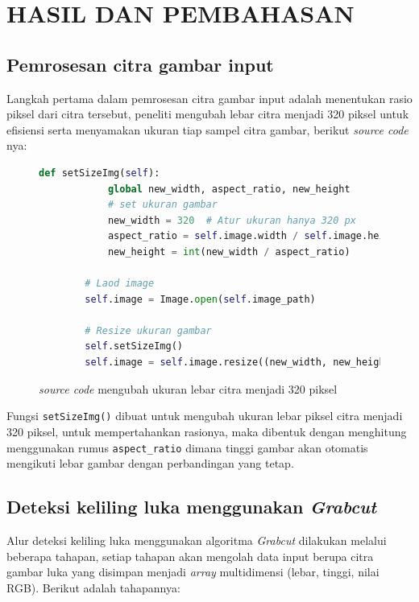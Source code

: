
\chapter{HASIL DAN PEMBAHASAN}

\section{Pemrosesan citra gambar input}
Langkah pertama dalam pemrosesan citra gambar input adalah menentukan rasio piksel 
dari citra tersebut, peneliti mengubah lebar citra menjadi 320 piksel untuk efisiensi 
serta menyamakan ukuran tiap sampel citra gambar, berikut \emph{source code} nya:

\begin{figure}[H]
	\begin{lstlisting}[language=Python, basicstyle=\tiny]
		def setSizeImg(self):
			global new_width, aspect_ratio, new_height
			# set ukuran gambar
			new_width = 320  # Atur ukuran hanya 320 px
			aspect_ratio = self.image.width / self.image.height
			new_height = int(new_width / aspect_ratio)
		
		# Laod image
		self.image = Image.open(self.image_path)

		# Resize ukuran gambar
		self.setSizeImg() 
		self.image = self.image.resize((new_width, new_height)) 
	\end{lstlisting}
	\caption{\emph{source code} mengubah ukuran lebar citra menjadi 320 piksel}
	\label{code:resize_gambar}
\end{figure}

Fungsi \texttt{setSizeImg()} dibuat untuk mengubah ukuran lebar piksel citra 
menjadi 320 piksel, untuk mempertahankan rasionya, maka dibentuk dengan menghitung
menggunakan rumus \texttt{aspect\_ratio} dimana tinggi gambar akan otomatis mengikuti lebar gambar 
dengan perbandingan yang tetap.

\section{Deteksi keliling luka menggunakan \emph{Grabcut}}
Alur deteksi keliling luka menggunakan algoritma \emph{Grabcut} dilakukan melalui
beberapa tahapan, setiap tahapan akan mengolah data input berupa citra gambar luka 
yang disimpan menjadi \emph{array} multidimensi (lebar, tinggi, nilai RGB).
Berikut adalah tahapannya:

